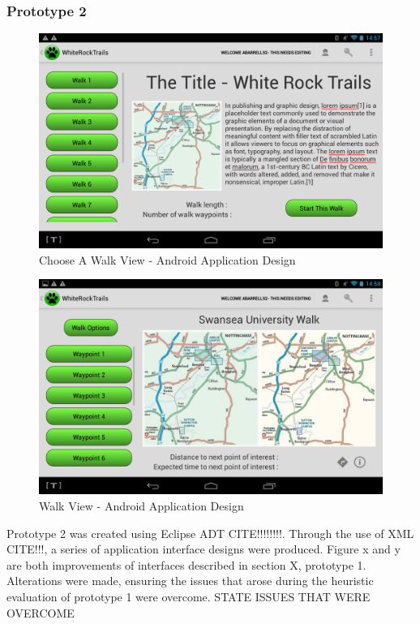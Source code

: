 \documentclass[11pt,a4paper]{article}
\begin{document}
\subsubsection{Prototype 2}

\begin{figure}[h!]
\begin{center}
\includegraphics[width=12cm]{./img/app_choose_walk.png}
\caption{Choose A Walk View - Android Application Design} 
\end{center}
\end{figure}


\begin{figure}[h!]
\begin{center}
\includegraphics[width=12cm]{./img/app_walk_view.png}
\caption{Walk View - Android Application Design} 
\end{center}
\end{figure}

Prototype 2 was created using Eclipse ADT CITE!!!!!!!!. Through the use of XML CITE!!!, a series of application interface designs were produced. Figure x and y are both improvements of interfaces described in section X, prototype 1. Alterations were made, ensuring the issues that arose during the heuristic evaluation of prototype 1 were overcome. STATE ISSUES THAT WERE OVERCOME
\end{document}

